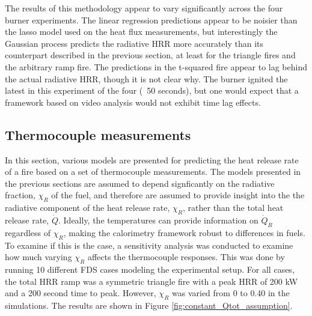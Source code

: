 \documentclass{article}
\begin{document}
The results of this methodology appear to vary significantly across the four burner experiments. The linear regression predictions appear to be noisier than the lasso model used on the heat flux measurements, but interestingly the Gaussian process predicts the radiative HRR more accurately than its counterpart described in the previous section, at least for the triangle fires and the arbitrary ramp fire. The predictions in the t-squared fire appear to lag behind the actual radiative HRR, though it is not clear why. The burner ignited the latest in this experiment of the four (~50 seconds), but one would expect that a framework based on video analysis would not exhibit time lag effects. 


\clearpage
\subsection{Thermocouple measurements}
In this section, various models are presented for predicting the heat release rate of a fire based on a set of thermocouple measurements. The models presented in the previous sections are assumed to depend signficantly on the radiative fraction, $\chi_R$ of the fuel, and therefore are assumed to provide insight into the the radiative component of the heat release rate, $\chi_R$, rather than the total heat release rate, $\dot{Q}$. Ideally, the temperatures can provide information on $\dot{Q}_R$ regardless of $\chi_R$, making the calorimetry framework robust to differences in fuels. To examine if this is the case, a sensitivity analysis was conducted to examine how much varying $\chi_R$ affects the thermocouple responses. This was done by running 10 different FDS cases modeling the experimental setup. For all cases, the total HRR ramp was a symmetric triangle fire with a peak HRR of 200 kW and a 200 second time to peak. However, $\chi_R$ was varied from 0 to 0.40 in the simulations. The results are shown in Figure \ref{fig:constant_Qtot_assumption}. 
\end{document}

